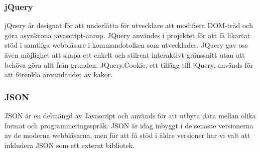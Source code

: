\subsubsection{jQuery} 
jQuery är designat för att underlätta för utvecklare att modifiera DOM-träd och göra asynkrona javascript-anrop. JQuery användes i projektet för att få likartat stöd i samtliga webbläsare i kommandotolken som utvecklades. 
JQuery gav oss även möjlighet att skapa ett enkelt och stilrent interaktivt gränssnitt utan att behöva göra allt från grunden.
JQuery.Cookie, ett tillägg till jQuery, används för att förenkla användandet av kakor.

\subsubsection{JSON}
JSON \citep{json}  är en delmängd av Javascript och används för att utbyta data mellan olika format och programmeringsspråk. 
JSON är idag inbyggt i de senaste versionerna av de moderna webbläsarna, men för att få stöd i äldre versioner har vi valt att inkludera JSON som ett externt bibliotek.

